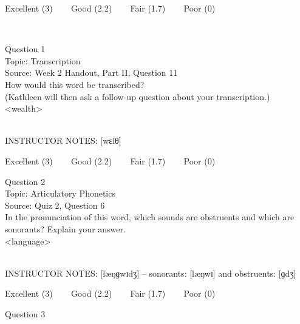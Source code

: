 \documentclass[12pt]{article}
\begin{document}
\vfill
Excellent (3) ~~~ Good (2.2) ~~~ Fair (1.7) ~~~ Poor (0)
\newpage

\begin{center}
\textbf{{\color{red}{\HUGE END OF EXAM}}}\\

\end{center}
\newpage

\begin{center}
\textbf{{\color{blue}{\HUGE START OF EXAM\\}}}

\textbf{{\color{blue}{\HUGE Student ID: 72428\\}}}

\textbf{{\color{blue}{\HUGE \\}}}

\end{center}
\newpage

{\large Question 1}\\

Topic: Transcription\\
Source: Week 2 Handout, Part II, Question 11\\

How would this word be transcribed?\\ (Kathleen will then ask a follow-up question about your transcription.)\\

<wealth>


~\\
INSTRUCTOR NOTES: [wɛlθ]


\vfill
Excellent (3) ~~~ Good (2.2) ~~~ Fair (1.7) ~~~ Poor (0)
\newpage

{\large Question 2}\\

Topic: Articulatory Phonetics\\
Source: Quiz 2, Question 6\\

In the pronunciation of this word, which sounds are obstruents and which are sonorants? Explain your answer.\\

<language>


~\\
INSTRUCTOR NOTES: [læŋɡwɪdʒ] -- sonorants: [læŋwɪ] and obstruents: [ɡdʒ]


\vfill
Excellent (3) ~~~ Good (2.2) ~~~ Fair (1.7) ~~~ Poor (0)
\newpage

{\large Question 3}\\
\end{document}
